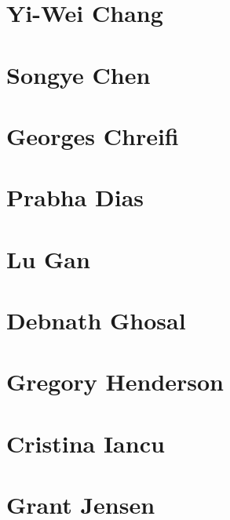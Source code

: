 \documentclass[]{tufte-book}
\begin{document}
\hypertarget{yi-wei_chang}{%
\section*{Yi-Wei Chang}\label{yi-wei_chang}}

\hypertarget{songye_chen}{%
\section*{Songye Chen}\label{songye_chen}}

\hypertarget{georges_chreifi}{%
\section*{Georges Chreifi}\label{georges_chreifi}}

\hypertarget{prabha_dias}{%
\section*{Prabha Dias}\label{prabha_dias}}

\hypertarget{lu_gan}{%
\section*{Lu Gan}\label{lu_gan}}

\hypertarget{debnath_ghosal}{%
\section*{Debnath Ghosal}\label{debnath_ghosal}}

\hypertarget{gregory_henderson}{%
\section*{Gregory Henderson}\label{gregory_henderson}}

\hypertarget{cristina_iancu}{%
\section*{Cristina Iancu}\label{cristina_iancu}}

\hypertarget{grant_jensen}{%
\section*{Grant Jensen}\label{grant_jensen}}
\end{document}
